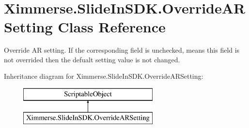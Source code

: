 \hypertarget{class_ximmerse_1_1_slide_in_s_d_k_1_1_override_a_r_setting}{}\section{Ximmerse.\+Slide\+In\+S\+D\+K.\+Override\+A\+R\+Setting Class Reference}
\label{class_ximmerse_1_1_slide_in_s_d_k_1_1_override_a_r_setting}


Override AR setting. If the corresponding field is unchecked, means this field is not overrided then the defualt setting value is not changed.  


Inheritance diagram for Ximmerse.\+Slide\+In\+S\+D\+K.\+Override\+A\+R\+Setting\+:\begin{figure}[H]
\begin{center}
\leavevmode
\includegraphics[height=2.000000cm]{class_ximmerse_1_1_slide_in_s_d_k_1_1_override_a_r_setting}
\end{center}
\end{figure}
